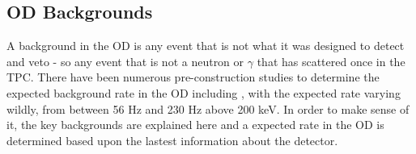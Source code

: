 \subsection{OD Backgrounds}
\label{sec:simulated_od_backgrounds}
\par
A background in the OD is any event that is not what it was designed to detect and veto - so any event that is not a neutron or $\gamma$ that has scattered once in the TPC.
There have been numerous pre-construction studies to determine the expected background rate in the OD including \cite{LZ_TechnicalDesignReview_ref,LZ_projected_sensitivity_paper_ref,sallyshaw_thesis_ref,scotthaselschwardt_thesis_ref,lz_od_taup_2019_ref}, with the expected rate varying wildly, from between 56 Hz and 230 Hz above 200 keV.
In order to make sense of it, the key backgrounds are explained here and a expected rate in the OD is determined based upon the lastest information about the detector.

